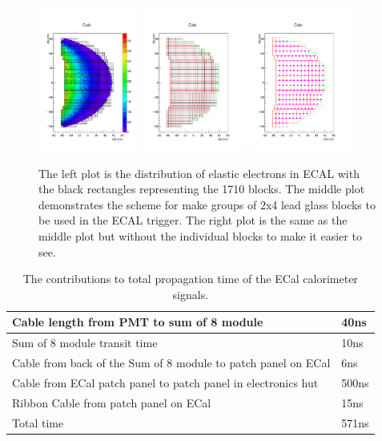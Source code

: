 \documentclass{article}
\begin{document}
\begin{figure}
	\centering
	\includegraphics[width=0.3\textwidth]{cfpbox.pdf}
	\includegraphics[width=0.3\textwidth]{cfpc.pdf}
	\includegraphics[width=0.3\textwidth]{cgr32.pdf}
	\caption{The left plot is the distribution of elastic electrons in ECAL with the black rectangles representing the 1710 blocks. The middle plot demonstrates
		the scheme for make groups of 2x4 lead glass blocks to be used in the ECAL trigger. The right plot is the same as the middle plot but without the individual blocks to make it easier to see.}\label{fig:ECALTrig}
\end{figure}
\begin{table}[b]
	\begin{tabular}{|l|l|} \hline
		Cable length from PMT to sum of 8 module & 40ns \\ \hline
		Sum of 8 module transit time & 10ns \\ \hline
		Cable from back of the Sum of 8 module to patch panel on ECal & 6ns \\ \hline
		Cable from ECal patch panel to patch panel in electronics hut & 500ns \\ \hline
		Ribbon Cable from patch panel on ECal & 15ns \\ \hline
		Total time & 571ns \\ \hline  		   		  		 		 
	\end{tabular}
	\caption{The contributions to total propagation time  of the ECal calorimeter signals.}
	\label{tab:ECALadctime}
\end{table}
\end{document}
